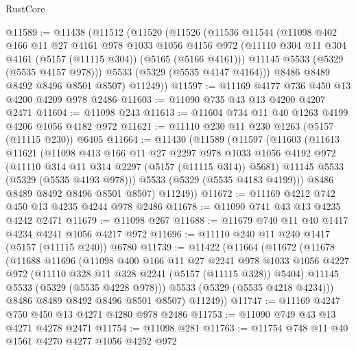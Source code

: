 \begin{lexlean}{RustCore}
\begin{coremodule}
@11589 := @11438
    (@11512
      (@11520
        (@11526
          (@11536
            @11544
            (@11098
              @402
              @166
              @11
              @27
              @4161
              @978
              @1033
              @1056
              @4156
              @972
              (@11110 @304 @11 @304 @4161 (@5157 (@11115 @304)) (@5165 (@5166 @4161)))
              @11145
              @5533
              (@5329 (@5535 @4157 @978)))
            @5533
            (@5329 (@5535 @4147 @4164)))
          @8486
          @8489
          @8492
          @8496
          @8501
          @8507)
        @11249))
@11597 := @11169 @4177 @736 @450 @13 @4200 @4209 @978 @2486
@11603 := @11090 @735 @43 @13 @4200 @4207 @2471
@11604 := @11098 @243
@11613 := @11604 @734 @11 @40 @1263 @4199 @4206 @1056 @4182 @972
@11621 := @11110 @230 @11 @230 @1263 (@5157 (@11115 @230)) @6405
@11664 := @11430
    (@11589
      (@11597
        (@11603
          (@11613
            @11621
            (@11098
              @413
              @166
              @11
              @27
              @2297
              @978
              @1033
              @1056
              @4192
              @972
              (@11110 @314 @11 @314 @2297 (@5157 (@11115 @314)) @5681)
              @11145
              @5533
              (@5329 (@5535 @4193 @978)))
            @5533
            (@5329 (@5535 @4183 @4199)))
          @8486
          @8489
          @8492
          @8496
          @8501
          @8507)
        @11249))
@11672 := @11169 @4212 @742 @450 @13 @4235 @4244 @978 @2486
@11678 := @11090 @741 @43 @13 @4235 @4242 @2471
@11679 := @11098 @267
@11688 := @11679 @740 @11 @40 @1417 @4234 @4241 @1056 @4217 @972
@11696 := @11110 @240 @11 @240 @1417 (@5157 (@11115 @240)) @6780
@11739 := @11422
    (@11664
      (@11672
        (@11678
          (@11688
            @11696
            (@11098
              @400
              @166
              @11
              @27
              @2241
              @978
              @1033
              @1056
              @4227
              @972
              (@11110 @328 @11 @328 @2241 (@5157 (@11115 @328)) @5404)
              @11145
              @5533
              (@5329 (@5535 @4228 @978)))
            @5533
            (@5329 (@5535 @4218 @4234)))
          @8486
          @8489
          @8492
          @8496
          @8501
          @8507)
        @11249))
@11747 := @11169 @4247 @750 @450 @13 @4271 @4280 @978 @2486
@11753 := @11090 @749 @43 @13 @4271 @4278 @2471
@11754 := @11098 @281
@11763 := @11754 @748 @11 @40 @1561 @4270 @4277 @1056 @4252 @972

\end{coremodule}
\end{lexlean}
